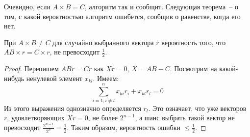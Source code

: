 Очевидно, если $A\times B=C$, алгоритм так и сообщит. Следующая теорема~-- о том, с какой вероятностью алгоритм ошибется, сообщив о равенстве, когда его нет.

\begin{theorem*} 
    При $A\times B \neq C$ для случайно выбранного вектора $r$ вероятность того, что $AB\times r = C\times r$, не превосходит $\frac{1}{2}$.
\end{theorem*}
\begin{proof}
Перепишем $ABr = Cr$ как $Xr=0$, $X=AB-C$. Посмотрим на какой-нибудь ненулевой элемент $x_{kl}$. Имеем:
$$\sum_{i=1, i\ne l}^{n} x_{ki}r_i+x_{kl}r_l=0$$
Из этого выражения однозначно определяется $r_l$. Это означает, что уже векторов $r$, удовлетворяющих $Xr=0$, не более $2^{n-1}$, а шанс выбрать такой вектор не превосходит $\frac{2^{n-1}}{2^n} = \frac{1}{2}$. Таким образом, вероятность ошибки $\le\frac{1}{2}$. \end{proof}
